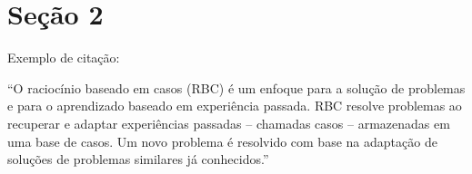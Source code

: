\section{Seção 2}
Exemplo de citação:

\begin{citacao}
``O raciocínio baseado em casos (RBC) é um enfoque para a solução de problemas e para o aprendizado baseado em experiência passada. RBC resolve problemas ao recuperar e adaptar experiências passadas – chamadas casos – armazenadas em uma base de casos. Um novo problema é resolvido com base na adaptação de soluções de problemas similares já conhecidos.'' \cite{wang}
\end{citacao}


